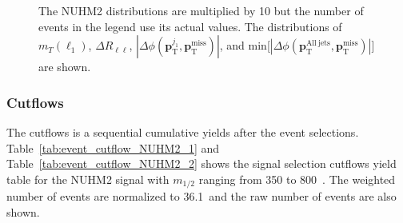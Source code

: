 \begin{figure}[htbp]
{    The NUHM2 distributions are multiplied by 10 but the number of events in the legend use its actual values.
    The distributions of $m_{T}(\ell_{1})$, $\Delta R_{\ell \ell}$, $|\Delta \phi(\mathbf{p}_\mathrm{T}^{j_{1}}, \mathbf{p}_\mathrm{T}^\mathrm{miss})|$, and min[$|\Delta \phi(\mathbf{p}_\mathrm{T}^\mathrm{All\ jets}, \mathbf{p}_\mathrm{T}^\mathrm{miss})|$] are shown.}
    \label{fig:event_nuhm2_kinematic_in_SR_SFOS_3}
\end{figure}


\subsubsection{Cutflows}
\label{subsubsec:event_cutflows}
The cutflows is a sequential cumulative yields after the event selections.
Table~\ref{tab:event_cutflow_NUHM2_1} and Table~\ref{tab:event_cutflow_NUHM2_2} shows the signal selection cutflows yield table for the NUHM2 signal with $m_{1/2}$ ranging from 350 to 800~{\GeV}.
The weighted number of events are normalized to 36.1~\ifb and the raw number of events are also shown.

